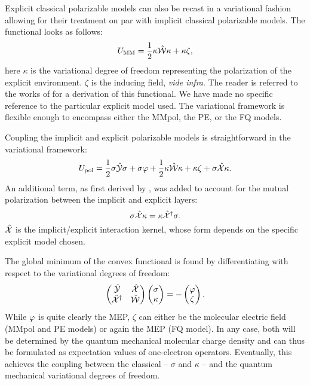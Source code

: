 Explicit classical polarizable models can also be recast in a
variational fashion allowing for their treatment on par with implicit
classical polarizable models.
The functional looks as follows:
\begin{equation}\label{eq:mm-functional}
  U_\mathrm{MM} = \frac{1}{2}\kappa\hat{\mathcal{W}}\kappa + \kappa\zeta,
\end{equation}
here $\kappa$ is the variational degree of freedom representing
the polarization of the explicit environment. $\zeta$ is the inducing
field, \emph{vide infra}. The reader is referred to the works of
\citeauthor{Lipparini2011-rd} for a derivation of this functional.\autocite{Lipparini2011-rd, Lipparini2015-lq, Loco2016-oy}
We have made no specific reference to the particular explicit
model used. The variational framework is flexible enough to encompass
either the MMpol,\autocite{Mennucci2013-go}
the \gls{PE},\autocite{Olsen2010-wa, Olsen2011-io} or
the \gls{FQ} models.\autocite{Rick1994-mn, Rick1995-wu, Rick1996-om,
Lipparini2011-rd}

Coupling the implicit and explicit polarizable models is straightforward
in the variational framework:\autocite{Steindal2011-ki, Lipparini2011-rd,
Caprasecca2012-ir, Lipparini2013-ud}
\begin{equation}\label{eq:pcm-mm-functional}
  U_\mathrm{pol} =
   \frac{1}{2}\sigma\hat{\mathcal{Y}}\sigma + \sigma\varphi
 + \frac{1}{2}\kappa\hat{\mathcal{W}}\kappa + \kappa\zeta
 + \sigma\hat{\mathcal{X}}\kappa.
\end{equation}
An additional term, as first derived by
\citeauthor{Steindal2011-ki},\autocite{Steindal2011-ki} was added to
account for the mutual polarization between the implicit and explicit
layers:
\begin{equation}
  \sigma\hat{\mathcal{X}}\kappa = \kappa\hat{\mathcal{X}}^\dagger\sigma.
\end{equation}
$\hat{\mathcal{X}}$ is the implicit/explicit interaction kernel, whose form depends
on the specific explicit model chosen.

The global minimum of the convex functional is found by differentiating
with respect to the variational degrees of freedom:
\begin{equation}\label{eq:pcm-mm-stationarity}
  \begin{pmatrix}
    \hat{\mathcal{Y}} & \hat{\mathcal{X}} \\
    \hat{\mathcal{X}}^\dagger & \hat{\mathcal{W}}
  \end{pmatrix}
  \begin{pmatrix}
   \sigma \\
   \kappa
  \end{pmatrix}
  =
  -
  \begin{pmatrix}
   \varphi \\
   \zeta
  \end{pmatrix}.
\end{equation}
While $\varphi$ is quite clearly the \acrshort{MEP}, $\zeta$ can either be the
molecular electric field (MMpol and \acrshort{PE} models) or again the
\acrshort{MEP} (\acrshort{FQ} model).
In any case, both will be determined by the quantum mechanical molecular
charge density and can thus be formulated as expectation values of
one-electron operators.
Eventually, this achieves the coupling between the classical -- $\sigma$
and $\kappa$ -- and the quantum mechanical variational degrees of
freedom.

